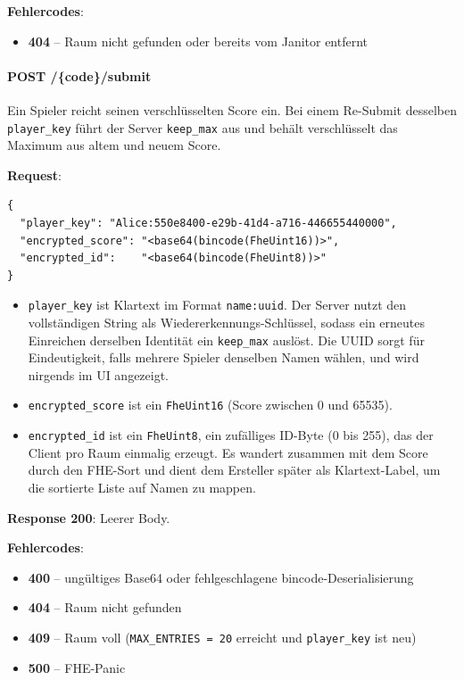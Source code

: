 \textbf{Fehlercodes}:
\begin{itemize}
    \item \textbf{404} -- Raum nicht gefunden oder bereits vom Janitor entfernt
\end{itemize}

\paragraph{POST /\{code\}/submit}

Ein Spieler reicht seinen verschlüsselten Score ein. Bei einem Re-Submit desselben \texttt{player\_key} führt der Server \texttt{keep\_max} aus und behält verschlüsselt das Maximum aus altem und neuem Score.

\textbf{Request}:
\begin{lstlisting}
{
  "player_key": "Alice:550e8400-e29b-41d4-a716-446655440000",
  "encrypted_score": "<base64(bincode(FheUint16))>",
  "encrypted_id":    "<base64(bincode(FheUint8))>"
}
\end{lstlisting}

\begin{itemize}
    \item \texttt{player\_key} ist Klartext im Format \texttt{name:uuid}. Der Server nutzt den vollständigen String als Wiedererkennungs-Schlüssel, sodass ein erneutes Einreichen derselben Identität ein \texttt{keep\_max} auslöst. Die UUID sorgt für Eindeutigkeit, falls mehrere Spieler denselben Namen wählen, und wird nirgends im UI angezeigt.
    \item \texttt{encrypted\_score} ist ein \texttt{FheUint16} (Score zwischen 0 und 65535).
    \item \texttt{encrypted\_id} ist ein \texttt{FheUint8}, ein zufälliges ID-Byte (0 bis 255), das der Client pro Raum einmalig erzeugt. Es wandert zusammen mit dem Score durch den FHE-Sort und dient dem Ersteller später als Klartext-Label, um die sortierte Liste auf Namen zu mappen.
\end{itemize}

\textbf{Response 200}: Leerer Body.

\textbf{Fehlercodes}:
\begin{itemize}
    \item \textbf{400} -- ungültiges Base64 oder fehlgeschlagene bincode-Deserialisierung
    \item \textbf{404} -- Raum nicht gefunden
    \item \textbf{409} -- Raum voll (\texttt{MAX\_ENTRIES = 20} erreicht und \texttt{player\_key} ist neu)
    \item \textbf{500} -- FHE-Panic
\end{itemize}


